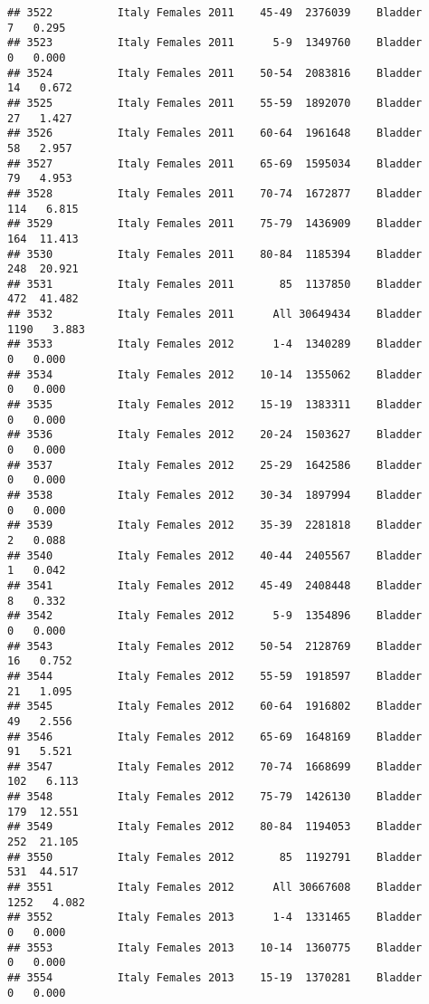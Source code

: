 \documentclass[
]{article}
\begin{document}
\begin{verbatim}
## 3522          Italy Females 2011    45-49  2376039    Bladder      7   0.295
## 3523          Italy Females 2011      5-9  1349760    Bladder      0   0.000
## 3524          Italy Females 2011    50-54  2083816    Bladder     14   0.672
## 3525          Italy Females 2011    55-59  1892070    Bladder     27   1.427
## 3526          Italy Females 2011    60-64  1961648    Bladder     58   2.957
## 3527          Italy Females 2011    65-69  1595034    Bladder     79   4.953
## 3528          Italy Females 2011    70-74  1672877    Bladder    114   6.815
## 3529          Italy Females 2011    75-79  1436909    Bladder    164  11.413
## 3530          Italy Females 2011    80-84  1185394    Bladder    248  20.921
## 3531          Italy Females 2011       85  1137850    Bladder    472  41.482
## 3532          Italy Females 2011      All 30649434    Bladder   1190   3.883
## 3533          Italy Females 2012      1-4  1340289    Bladder      0   0.000
## 3534          Italy Females 2012    10-14  1355062    Bladder      0   0.000
## 3535          Italy Females 2012    15-19  1383311    Bladder      0   0.000
## 3536          Italy Females 2012    20-24  1503627    Bladder      0   0.000
## 3537          Italy Females 2012    25-29  1642586    Bladder      0   0.000
## 3538          Italy Females 2012    30-34  1897994    Bladder      0   0.000
## 3539          Italy Females 2012    35-39  2281818    Bladder      2   0.088
## 3540          Italy Females 2012    40-44  2405567    Bladder      1   0.042
## 3541          Italy Females 2012    45-49  2408448    Bladder      8   0.332
## 3542          Italy Females 2012      5-9  1354896    Bladder      0   0.000
## 3543          Italy Females 2012    50-54  2128769    Bladder     16   0.752
## 3544          Italy Females 2012    55-59  1918597    Bladder     21   1.095
## 3545          Italy Females 2012    60-64  1916802    Bladder     49   2.556
## 3546          Italy Females 2012    65-69  1648169    Bladder     91   5.521
## 3547          Italy Females 2012    70-74  1668699    Bladder    102   6.113
## 3548          Italy Females 2012    75-79  1426130    Bladder    179  12.551
## 3549          Italy Females 2012    80-84  1194053    Bladder    252  21.105
## 3550          Italy Females 2012       85  1192791    Bladder    531  44.517
## 3551          Italy Females 2012      All 30667608    Bladder   1252   4.082
## 3552          Italy Females 2013      1-4  1331465    Bladder      0   0.000
## 3553          Italy Females 2013    10-14  1360775    Bladder      0   0.000
## 3554          Italy Females 2013    15-19  1370281    Bladder      0   0.000

\end{verbatim}
\end{document}
